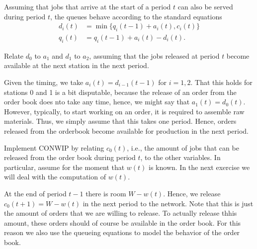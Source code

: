 \documentclass{scrartcl}
\begin{document}
Assuming that jobs that arrive at the start of a period $t$ can also be served during period $t$, the queues behave according to the standard equations
\begin{align*}
  d_i(t) &= \min\{q_i(t-1) + a_i(t), c_i(t)\} \\
  q_i(t) &= q_i(t-1) + a_i(t) - d_i(t).
\end{align*}


\begin{exercise} Relate $d_0$ to $a_1$ and $d_1$ to $a_2$, assuming that the jobs released at period $t$ become available at the next station in the next period.
  \begin{solution}
    Given the timing, we take $a_i(t) = d_{i-1}(t-1)$ for $i=1,2$.
    That this holds for stations 0 and 1 is a bit disputable, because the release of an order from the order book does nto take any time, hence, we might say that $a_1(t) = d_0(t)$.
    However, typically, to start working on an order, it is required to assemble raw materials.
    Thus, we simply assume that this takes one period.
    Hence, orders released from the orderbook become available for production in the next period.
  \end{solution}
\end{exercise}

\begin{exercise}
  Implement CONWIP by relating $c_0(t)$, i.e., the amount of jobs that can be released from the order book during period $t$, to the other variables.
  In particular, assume for the moment that $w(t)$ is known.
  In the next exercise we will deal with the computation of $w(t)$.
  \begin{solution}
    At the end of period $t-1$ there is room $W-w(t)$.
    Hence, we release $c_0(t+1) = W-w(t)$ in the next period to the network.
    Note that this is just the amount of orders that we are willing to release.
    To actually release thhis amount, these orders should of course be available in the order book.
    For this reason we also use the queueing equations to model the behavior of the order book.
  \end{solution}
\end{exercise}
\end{document}
